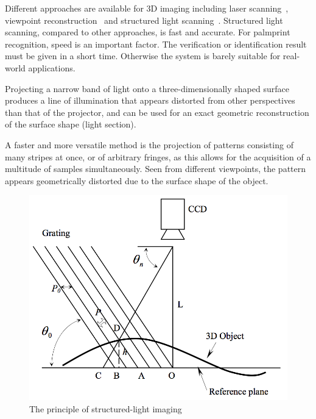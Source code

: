
Different approaches are available for 3D imaging including laser scanning~\cite{Blais:1988te}, viewpoint reconstruction~\cite{Hartley:2000un} and structured light scanning~\cite{Halioua:1984ue}. Structured light scanning, compared to other approaches, is fast and accurate. For palmprint recognition, speed is an important factor. The verification or identification result must be given in a short time. Otherwise the system is barely suitable for real-world applications.


Projecting a narrow band of light onto a three-dimensionally shaped surface produces a line of illumination that appears distorted from other perspectives than that of the projector, and can be used for an exact geometric reconstruction of the surface shape (light section).

A faster and more versatile method is the projection of patterns consisting of many stripes at once, or of arbitrary fringes, as this allows for the acquisition of a multitude of samples simultaneously. Seen from different viewpoints, the pattern appears geometrically distorted due to the surface shape of the object.

\begin{figure}[htb]
  \begin{center}
    \includegraphics[width=0.9\linewidth]{ch-pastwork/figures/sli}
    \caption[The principle of structured-light imaging]{The principle of structured-light imaging\cite{Li:2009eq}}
    \label{fig:pastwork:sli}
  \end{center}
\end{figure}

